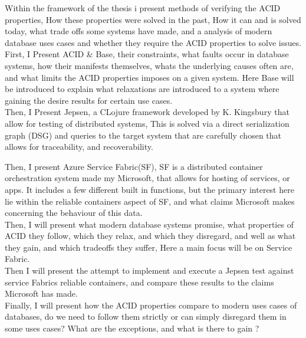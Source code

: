 \documentclass[a4paper,10pt,titlepage]{report}
\begin{document}
Within the framework of the thesis i present methods of verifying the ACID properties, How these properties were solved in the past, How it can and is solved today, what trade offs some systems have made, and a analysis of modern database uses cases and whether they require the ACID properties to solve issues.\\
\vspace{5mm}
First, I Present ACID \& Base, their constraints, what faults occur in database systems, how their manifests themselves, whats the underlying causes often are, and what limits the ACID properties imposes on a given system. Here Base will be introduced to explain what relaxations are introduced to a system where gaining the desire results for certain use cases. \\
\vspace{5mm}
Then, I Present Jepsen, a CLojure framework\cite{jepsonio} developed by K. Kingsbury that allow for testing of distributed systems, This is solved via a direct serialization graph (DSG) and queries to the target system that are carefully chosen that allows for traceability, and recoverability.  \\
\vspace{5mm}

Then, I present Azure Service Fabric(SF), SF is a distributed container orchestration system made my Microsoft, that allows for hosting of services, or apps. It includes a few different built in functions, but the primary interest here lie within the reliable containers aspect of SF, and what claims Microsoft makes concerning the behaviour of this data.\\
\vspace{5mm}
Then, I will present what modern database systems promise, what properties of ACID they follow, which they relax, and which they disregard, and well as what they gain, and which tradeoffs they suffer, Here a main focus will be on Service Fabric.\\
\vspace{5mm}
Then I will present the attempt to implement and execute a Jepsen test against service Fabrics reliable containers, and compare these results to the claims Microsoft has made.\\
\vspace{5mm}
Finally, I will present how the ACID properties compare to modern uses cases of databases, do we need to follow them strictly or can simply disregard them in some uses cases? What are the exceptions, and what is there to gain ?\\
\end{document}
